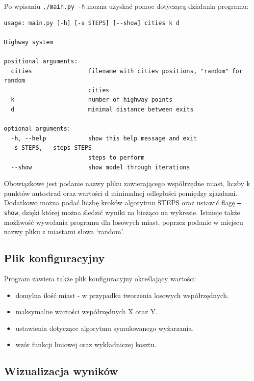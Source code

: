 \documentclass[a4paper]{article}
\begin{document}
Po wpisaniu \texttt{./main.py -h} mozna uzyskać pomoc dotyczącą działania programu:
\begin{lstlisting}[basicstyle=\ttfamily\selectfont\footnotesize]
usage: main.py [-h] [-s STEPS] [--show] cities k d

Highway system

positional arguments:
  cities                filename with cities positions, "random" for random
                        cities
  k                     number of highway points
  d                     minimal distance between exits

optional arguments:
  -h, --help            show this help message and exit
  -s STEPS, --steps STEPS
                        steps to perform
  --show                show model through iterations
\end{lstlisting}

Obowiązkowe jest podanie nazwy pliku zawierającego współrzędne miast, liczby k punktów autostrad oraz wartości d minimalnej odległości pomiędzy zjazdami.\newline
Dodatkowo można podać liczbę kroków algorytmu STEPS oraz ustawić flagę \texttt{--show}, dzięki której można śledzić wyniki na bieżąco na wykresie.\newline
Istnieje także możliwość wywołania programu dla losowych miast, poprzez podanie w miejscu nazwy pliku z miastami słowa `random'. 

\subsection{Plik konfiguracyjny}

Program zawiera także plik konfiguracyjny określający wartości:
\begin{itemize}
\item domylna ilość miast - w przypadku tworzenia losowych współrzędnych.
\item maksymalne wartości współrzędnych X oraz Y.
\item ustawienia dotyczące algorytmu symulowanego wyżarzania.
\item wzór funkcji liniowej oraz wykładniczej kosztu.
\end{itemize}

\subsection{Wizualizacja wyników}
\end{document}
